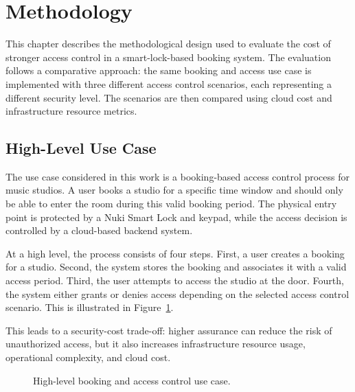 \section{Methodology}

This chapter describes the methodological design used to evaluate the cost of stronger access control in a smart-lock-based booking system. The evaluation follows a comparative approach: the same booking and access use case is implemented with three different access control scenarios, each representing a different security level. The scenarios are then compared using cloud cost and infrastructure resource metrics.

\subsection{High-Level Use Case}

The use case considered in this work is a booking-based access control process for music studios. A user books a studio for a specific time window and should only be able to enter the room during this valid booking period. The physical entry point is protected by a Nuki Smart Lock and keypad, while the access decision is controlled by a cloud-based backend system.

At a high level, the process consists of four steps. First, a user creates a booking for a studio. Second, the system stores the booking and associates it with a valid access period. Third, the user attempts to access the studio at the door. Fourth, the system either grants or denies access depending on the selected access control scenario. This is illustrated in Figure~\ref{fig:high_level_use_case}.

This leads to a security-cost trade-off: higher assurance can reduce the risk of unauthorized access, but it also increases infrastructure resource usage, operational complexity, and cloud cost.

\begin{figure}[H]
\centering
{}
\caption{High-level booking and access control use case.}
\label{fig:high_level_use_case}
\end{figure}

